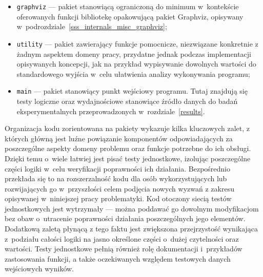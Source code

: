 {\begin{itemize}
    \item \texttt{graphviz} --- pakiet stanowiącą ograniczoną do minimum w~kontekście oferowanych funkcji bibliotekę opakowującą pakiet Graphviz, opisywany w~podrozdziale~\ref{sss_internals_misc_graphviz};
    \item \texttt{utility} --- pakiet zawierający funkcje pomocnicze, niezwiązane konkretnie z żadnym aspektem domeny pracy, przydatne jednak podczas implementacji opisywanych koncepcji, jak na przykład wypisywanie dowolnych wartości do standardowego wyjścia w~celu ułatwienia analizy wykonywania programu;
    \item \texttt{main} --- pakiet stanowiący punkt wejściowy programu. Tutaj znajdują się testy logiczne oraz wydajnościowe stanowiące źródło danych do badań eksperymentalnych przeprowadzonych w~rozdziale~\ref{results}.
  \end{itemize}
}
\par{
  Organizacja kodu zorientowana na pakiety wykazuje kilka kluczowych zalet, z których główną jest luźne powiązanie komponentów odpowiadających za poszczególne aspekty domeny problemu oraz funkcje potrzebne do ich obsługi.
  Dzięki temu o~wiele łatwiej jest pisać testy jednostkowe, izolując poszczególne części logiki w~celu weryfikacji poprawności ich działania. 
  Bezpośrednio przekłada się to na rozszerzalność kodu dla osób wykorzystujących lub rozwijających go w~przyszłości celem podjęcia nowych wyzwań z zakresu opisywanej w~niniejszej pracy problematyki.
  Kod otoczony siecią testów jednostkowych jest wytrzymały --- można poddawać go dowolnym modyfikacjom bez obaw o~utracenie poprawności działania poszczególnych jego elementów.
  Dodatkową zaletą płynącą z tego faktu jest zwiększona przejrzystość wynikająca z~podziału całości logiki na jasno określone części o~dużej czytelności oraz wartości.
  Testy jednostkowe pełnią również rolę dokumentacji i~przykładów zastosowania funkcji, a także oczekiwanych względem testowych danych wejściowych wyników.
}